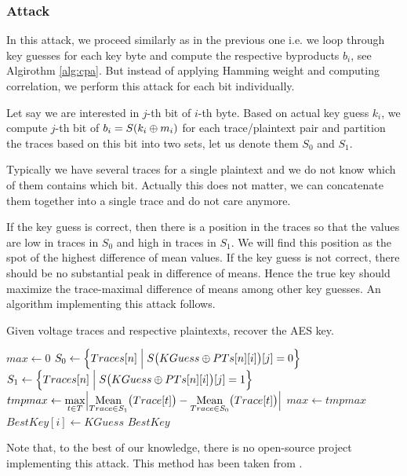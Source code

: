\subsubsection{Attack}

In this attack, we proceed similarly as in the previous one i.e. we loop through key guesses for each key byte and compute the respective byproducts $b_i$, see Algirothm \ref{alg:cpa}. But instead of applying Hamming weight and computing correlation, we perform this attack for each bit individually.

Let say we are interested in $j$-th bit of $i$-th byte. Based on actual key guess $k_i$, we compute $j$-th bit of $b_i = S(k_i\oplus m_i)$ for each trace/plaintext pair and partition the traces based on this bit into two sets, let us denote them $S_0$ and $S_1$.

\begin{note}
	Typically we have several traces for a single plaintext and we do not know which of them contains which bit. Actually this does not matter, we can concatenate them together into a single trace and do not care anymore.
\end{note}

If the key guess is correct, then there is a position in the traces so that the values are low in traces in $S_0$ and high in traces in $S_1$. We will find this position as the spot of the highest difference of mean values. If the key guess is not correct, there should be no substantial peak in difference of means. Hence the true key should maximize the trace-maximal difference of means among other key guesses. An algorithm implementing this attack follows.

\begin{alg}
\label{alg:bitwisedpa}
Given voltage traces and respective plaintexts, recover the AES key.
	\begin{algorithmic}[1]
				\State $max \gets 0$
						\State $S_0 \gets \Bigl\{ Traces[n] \Bigm| S\bigl(KGuess\oplus PTs[n][i]\bigr)[j] = 0 \Bigr\}$
						\State $S_1 \gets \Bigl\{ Traces[n] \Bigm| S\bigl(KGuess\oplus PTs[n][i]\bigr)[j] = 1 \Bigr\}$
						\State $tmpmax \gets \max\limits_{t\in T} \Bigl| \operatorname*{Mean}\limits_{Trace\in S_1}\bigl(Trace[t]\bigr) - \operatorname*{Mean}\limits_{Trace\in S_0}\bigl(Trace[t]\bigr) \Bigr|$
							\State $max \gets tmpmax$
							\State $BestKey[i] \gets KGuess$
						\EndIf
					\EndFor
				\EndFor
			\EndFor
			\State\Return $BestKey$
		\EndFunction
	\end{algorithmic}
\end{alg}

Note that, to the best of our knowledge, there is no open-source project implementing this attack. This method has been taken from \cite{teuwen2015movfuscator}.

